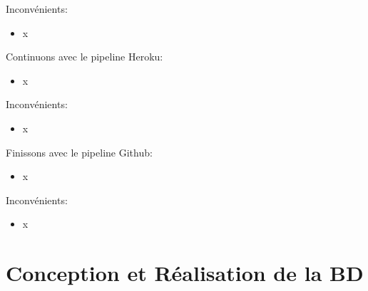 \documentclass[
    iai, %
    il, %
]{heig-tb}
\begin{document}
Inconvénients:
\begin{itemize}
    \item x
\end{itemize}

Continuons avec le pipeline Heroku:
\begin{itemize}
    \item x
\end{itemize}

Inconvénients:
\begin{itemize}
    \item x
\end{itemize}

Finissons avec le pipeline Github:
\begin{itemize}
    \item x
\end{itemize}

Inconvénients:
\begin{itemize}
    \item x
\end{itemize}





\chapter{Conception et Réalisation de la BD}
\end{document}
